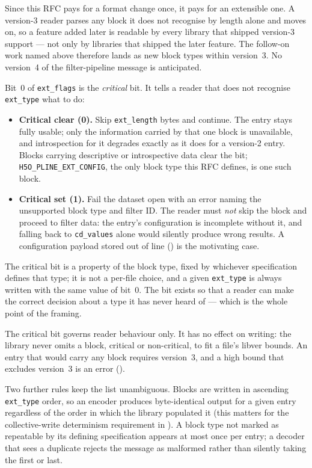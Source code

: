 \documentclass[../RFC-HDFG-2026-001.tex]{subfiles}
\begin{document}
Since this RFC pays for a format change once, it pays for an extensible
one.  A version-3 reader parses any block it does not recognise by length
alone and moves on, so a feature added later is readable by every library
that shipped version-3 support --- not only by libraries that shipped the
later feature.  The follow-on work named above therefore lands as new
block types within version~3.  No version~4 of the filter-pipeline message
is anticipated.


Bit~0 of \texttt{ext\_flags} is the \emph{critical} bit.  It tells a
reader that does not recognise \texttt{ext\_type} what to do:

\begin{itemize}
\item \textbf{Critical clear (0).}  Skip \texttt{ext\_length} bytes and
  continue.  The entry stays fully usable; only the information carried by
  that one block is unavailable, and introspection for it degrades exactly
  as it does for a version-2 entry.  Blocks carrying descriptive or
  introspective data clear the bit; \texttt{H5O\_PLINE\_EXT\_CONFIG}, the
  only block type this RFC defines, is one such block.
\item \textbf{Critical set (1).}  Fail the dataset open with an error
  naming the unsupported block type and filter ID.  The reader must
  \emph{not} skip the block and proceed to filter data: the entry's
  configuration is incomplete without it, and falling back to
  \texttt{cd\_values} alone would silently produce wrong results.  A
  configuration payload stored out of line ()
  is the motivating case.
\end{itemize}

The critical bit is a property of the block type, fixed by whichever
specification defines that type; it is not a per-file choice, and a given
\texttt{ext\_type} is always written with the same value of bit~0.  The
bit exists so that a reader can make the correct decision about a type it
has never heard of --- which is the whole point of the framing.

The critical bit governs reader behaviour only.  It has no effect on
writing: the library never omits a block, critical or non-critical, to fit
a file's libver bounds.  An entry that would carry any block requires
version~3, and a high bound that excludes version~3 is an error
().

Two further rules keep the list unambiguous.  Blocks are written in
ascending \texttt{ext\_type} order, so an encoder produces byte-identical
output for a given entry regardless of the order in which the library
populated it (this matters for the collective-write determinism
requirement in ).  A block type not marked as
repeatable by its defining specification appears at most once per entry;
a decoder that sees a duplicate rejects the message as malformed rather
than silently taking the first or last.
\end{document}
